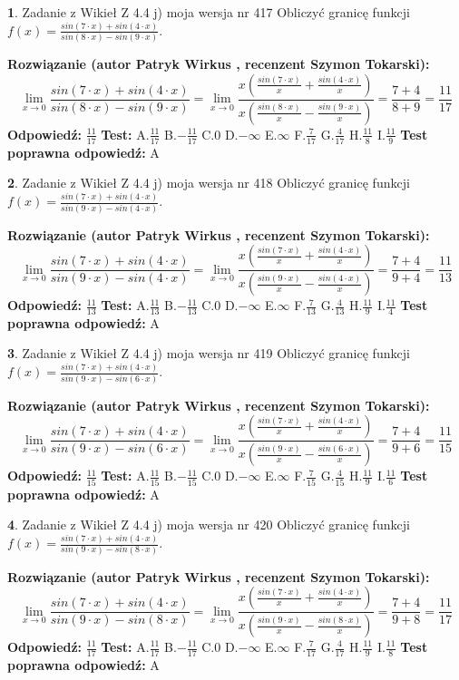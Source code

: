 \documentclass[12pt, a4paper]{article}
\theoremstyle{definition} %
\newtheorem{zad}{}
\newcommand{\zadStart}[1]{\begin{zad}#1\newline}
\newcommand{\zadStop}{\end{zad}}
\newcommand{\rozwStart}[2]{\noindent \textbf{Rozwiązanie (autor #1 , recenzent #2): }\newline}
\newcommand{\rozwStop}{\newline}
\newcommand{\odpStart}{\noindent \textbf{Odpowiedź:}\newline}
\newcommand{\odpStop}{\newline}
\newcommand{\testStart}{\noindent \textbf{Test:}\newline}
\newcommand{\testStop}{\newline}
\newcommand{\kluczStart}{\noindent \textbf{Test poprawna odpowiedź:}\newline}
\newcommand{\kluczStop}{\newline}
\begin{document}
\zadStart{Zadanie z Wikieł Z 4.4 j) moja wersja nr 417}
Obliczyć granicę funkcji $f(x)=\frac{sin(7\cdot x) +sin(4\cdot x)}{sin(8\cdot x) -sin(9\cdot x)}$.
\zadStop
\rozwStart{Patryk Wirkus}{Szymon Tokarski}
$$\lim\limits_{x\to 0}\frac{sin(7\cdot x) +sin(4\cdot x)}{sin(8\cdot x) -sin(9\cdot x)}=\lim\limits_{x\to 0}\frac{x(\frac{sin(7\cdot x)}{x}+\frac{sin(4\cdot x)}{x})}{x(\frac{sin(8\cdot x)}{x}-\frac{sin(9\cdot x)}{x})}=\frac{7+4}{8+9} = \frac{11}{17}$$
\rozwStop
\odpStart
$\frac{11}{17}$
\odpStop
\testStart
A.$\frac{11}{17}$
B.$-\frac{11}{17}$
C.$0$
D.$-\infty$
E.$\infty$
F.$\frac{7}{17}$
G.$\frac{4}{17}$
H.$\frac{11}{8}$
I.$\frac{11}{9}$
\testStop
\kluczStart
A
\kluczStop



\zadStart{Zadanie z Wikieł Z 4.4 j) moja wersja nr 418}
Obliczyć granicę funkcji $f(x)=\frac{sin(7\cdot x) +sin(4\cdot x)}{sin(9\cdot x) -sin(4\cdot x)}$.
\zadStop
\rozwStart{Patryk Wirkus}{Szymon Tokarski}
$$\lim\limits_{x\to 0}\frac{sin(7\cdot x) +sin(4\cdot x)}{sin(9\cdot x) -sin(4\cdot x)}=\lim\limits_{x\to 0}\frac{x(\frac{sin(7\cdot x)}{x}+\frac{sin(4\cdot x)}{x})}{x(\frac{sin(9\cdot x)}{x}-\frac{sin(4\cdot x)}{x})}=\frac{7+4}{9+4} = \frac{11}{13}$$
\rozwStop
\odpStart
$\frac{11}{13}$
\odpStop
\testStart
A.$\frac{11}{13}$
B.$-\frac{11}{13}$
C.$0$
D.$-\infty$
E.$\infty$
F.$\frac{7}{13}$
G.$\frac{4}{13}$
H.$\frac{11}{9}$
I.$\frac{11}{4}$
\testStop
\kluczStart
A
\kluczStop



\zadStart{Zadanie z Wikieł Z 4.4 j) moja wersja nr 419}
Obliczyć granicę funkcji $f(x)=\frac{sin(7\cdot x) +sin(4\cdot x)}{sin(9\cdot x) -sin(6\cdot x)}$.
\zadStop
\rozwStart{Patryk Wirkus}{Szymon Tokarski}
$$\lim\limits_{x\to 0}\frac{sin(7\cdot x) +sin(4\cdot x)}{sin(9\cdot x) -sin(6\cdot x)}=\lim\limits_{x\to 0}\frac{x(\frac{sin(7\cdot x)}{x}+\frac{sin(4\cdot x)}{x})}{x(\frac{sin(9\cdot x)}{x}-\frac{sin(6\cdot x)}{x})}=\frac{7+4}{9+6} = \frac{11}{15}$$
\rozwStop
\odpStart
$\frac{11}{15}$
\odpStop
\testStart
A.$\frac{11}{15}$
B.$-\frac{11}{15}$
C.$0$
D.$-\infty$
E.$\infty$
F.$\frac{7}{15}$
G.$\frac{4}{15}$
H.$\frac{11}{9}$
I.$\frac{11}{6}$
\testStop
\kluczStart
A
\kluczStop



\zadStart{Zadanie z Wikieł Z 4.4 j) moja wersja nr 420}
Obliczyć granicę funkcji $f(x)=\frac{sin(7\cdot x) +sin(4\cdot x)}{sin(9\cdot x) -sin(8\cdot x)}$.
\zadStop
\rozwStart{Patryk Wirkus}{Szymon Tokarski}
$$\lim\limits_{x\to 0}\frac{sin(7\cdot x) +sin(4\cdot x)}{sin(9\cdot x) -sin(8\cdot x)}=\lim\limits_{x\to 0}\frac{x(\frac{sin(7\cdot x)}{x}+\frac{sin(4\cdot x)}{x})}{x(\frac{sin(9\cdot x)}{x}-\frac{sin(8\cdot x)}{x})}=\frac{7+4}{9+8} = \frac{11}{17}$$
\rozwStop
\odpStart
$\frac{11}{17}$
\odpStop
\testStart
A.$\frac{11}{17}$
B.$-\frac{11}{17}$
C.$0$
D.$-\infty$
E.$\infty$
F.$\frac{7}{17}$
G.$\frac{4}{17}$
H.$\frac{11}{9}$
I.$\frac{11}{8}$
\testStop
\kluczStart
A
\kluczStop
\end{document}
